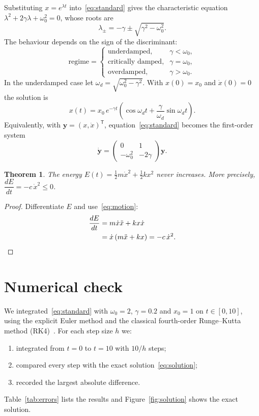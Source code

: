 \documentclass[11pt]{article}
\newtheorem{theorem}{Theorem}
\begin{document}
Substituting $x = e^{\lambda t}$ into~\eqref{eq:standard} gives the
characteristic equation $\lambda^2 + 2\gamma\lambda + \omega_0^2 = 0$, whose
roots are
\begin{equation}\label{eq:roots}
  \lambda_{\pm} = -\gamma \pm \sqrt{\gamma^2 - \omega_0^2}.
\end{equation}
The behaviour depends on the sign of the discriminant:
\[
  \text{regime} =
  \begin{cases}
    \text{underdamped}, & \gamma < \omega_0,\\
    \text{critically damped}, & \gamma = \omega_0,\\
    \text{overdamped}, & \gamma > \omega_0.
  \end{cases}
\]
In the underdamped case let $\omega_d = \sqrt{\omega_0^2 - \gamma^2}$. With
$x(0) = x_0$ and $\dot{x}(0) = 0$ the solution is
\begin{equation}\label{eq:solution}
  x(t) = x_0\, e^{-\gamma t}\left(\cos\omega_d t
         + \frac{\gamma}{\omega_d}\sin\omega_d t\right).
\end{equation}
Equivalently, with $\mathbf{y} = (x, \dot{x})^{\mathsf{T}}$,
equation~\eqref{eq:standard} becomes the first-order system
\begin{equation}\label{eq:system}
  \dot{\mathbf{y}} =
  \begin{pmatrix} 0 & 1 \\ -\omega_0^2 & -2\gamma \end{pmatrix}\mathbf{y}.
\end{equation}

\begin{theorem}
The energy $E(t) = \tfrac12 m\dot{x}^2 + \tfrac12 kx^2$ never increases. More
precisely, $\dfrac{dE}{dt} = -c\,\dot{x}^2 \le 0$.
\end{theorem}

\begin{proof}
Differentiate $E$ and use~\eqref{eq:motion}:
\begin{align*}
  \frac{dE}{dt} &= m\dot{x}\ddot{x} + kx\dot{x} \\
                &= \dot{x}\,(m\ddot{x} + kx) = -c\,\dot{x}^2. \qedhere
\end{align*}
\end{proof}

\section{Numerical check}

We integrated~\eqref{eq:standard} with $\omega_0 = 2$, $\gamma = 0.2$ and
$x_0 = 1$ on $t \in [0, 10]$, using the explicit Euler method and the
classical fourth-order Runge--Kutta method (RK4)~\cite{hairer}. For each step
size $h$ we:
\begin{enumerate}
  \item integrated from $t=0$ to $t=10$ with $10/h$ steps;
  \item compared every step with the exact solution~\eqref{eq:solution};
  \item recorded the largest absolute difference.
\end{enumerate}
Table~\ref{tab:errors} lists the results and Figure~\ref{fig:solution} shows
the exact solution.
\end{document}
